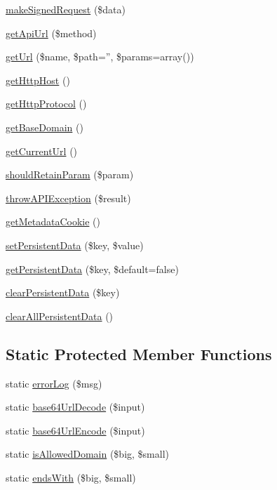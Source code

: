 \begin{DoxyCompactItemize}
\hyperlink{class_base_facebook_a03b1e5f1323206dc9acdc737cebc689a}{make\-Signed\-Request} (\$data)
\item 
\hyperlink{class_base_facebook_a3f443bdaad76813687f389b130284f0c}{get\-Api\-Url} (\$method)
\item 
\hyperlink{class_base_facebook_a96b679deac74fb2e12f5a43082c7e8ca}{get\-Url} (\$name, \$path='', \$params=array())
\item 
\hyperlink{class_base_facebook_a5263d3f1625e785f736275365141308f}{get\-Http\-Host} ()
\item 
\hyperlink{class_base_facebook_a2cac5d52cf45fd882ee0975bcb7e6747}{get\-Http\-Protocol} ()
\item 
\hyperlink{class_base_facebook_ab0b9668fe081b3b7eb36307bcb7688e8}{get\-Base\-Domain} ()
\item 
\hyperlink{class_base_facebook_a201542500ee128973c85ba86a15d505f}{get\-Current\-Url} ()
\item 
\hyperlink{class_base_facebook_a97ba740637372de0bc8545e149ac78e9}{should\-Retain\-Param} (\$param)
\item 
\hyperlink{class_base_facebook_a9586758de0577216593cf5cb23bca844}{throw\-A\-P\-I\-Exception} (\$result)
\item 
\hyperlink{class_base_facebook_a8aff32bba28c63a3e12ff2023f54df7b}{get\-Metadata\-Cookie} ()
\item 
\hyperlink{class_base_facebook_a7c395efe8594a2afd06b462e8858fee8}{set\-Persistent\-Data} (\$key, \$value)
\item 
\hyperlink{class_base_facebook_a2d31791ed8c3a7d09a4338aec8749a7d}{get\-Persistent\-Data} (\$key, \$default=false)
\item 
\hyperlink{class_base_facebook_afff378a3ec897db92a642279b5b4b738}{clear\-Persistent\-Data} (\$key)
\item 
\hyperlink{class_base_facebook_ad0f8fc371cee2e8a6aaf5972bd5e7d6a}{clear\-All\-Persistent\-Data} ()
\end{DoxyCompactItemize}
\subsection*{Static Protected Member Functions}
\begin{DoxyCompactItemize}
\item 
static \hyperlink{class_base_facebook_a9f8d1ae264b45ba5ead959705bdcf1e8}{error\-Log} (\$msg)
\item 
static \hyperlink{class_base_facebook_a99d1710c462be3995a1974d8e5f9599f}{base64\-Url\-Decode} (\$input)
\item 
static \hyperlink{class_base_facebook_a2c378cb5450c90538a1e846d9c17f78d}{base64\-Url\-Encode} (\$input)
\item 
static \hyperlink{class_base_facebook_a890f9a39c0d89d556384e429ee4886ed}{is\-Allowed\-Domain} (\$big, \$small)
\item 
static \hyperlink{class_base_facebook_a9597d735c8a502a3cbcffa1791f44667}{ends\-With} (\$big, \$small)
\end{DoxyCompactItemize}
